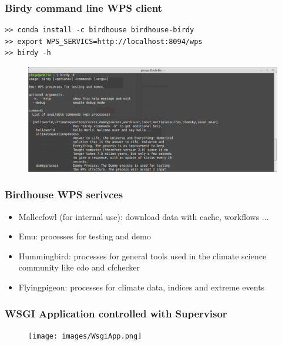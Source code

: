 \documentclass{beamer}
\begin{document}

  \begin{frame}[fragile]
    \frametitle{Birdy command line WPS client}
    \begin{verbatim}
>> conda install -c birdhouse birdhouse-birdy
>> export WPS_SERVICS=http://localhost:8094/wps
>> birdy -h
    \end{verbatim}
    \begin{figure}
      \includegraphics[width=11.5cm]{images/birdy-terminal.png}
    \end{figure}
\end{frame}


  \begin{frame}
    \frametitle{Birdhouse WPS serivces}
    \begin{itemize}
      \item Malleefowl (for internal use): download data with cache, workflows ...
      \item Emu: processes for testing and demo
      \item Hummingbird: processes for general tools used in the climate science community like cdo and cfchecker
      \item Flyingpigeon: processes for climate data, indices and extreme events
    \end{itemize}
  \end{frame}



  \begin{frame}[plain]
    \frametitle{WSGI Application controlled with Supervisor}
    \begin{figure}
      \texttt{[image: images/WsgiApp.png]}
    \end{figure}
  \end{frame}

\end{document}
